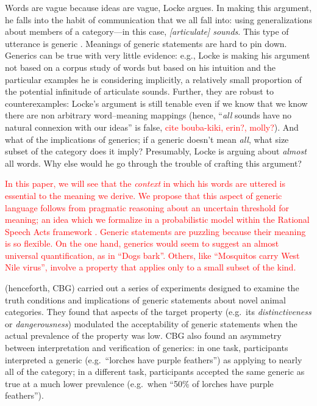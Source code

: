 \documentclass[10pt,letterpaper]{article}
\newcommand{\red}[1]{\textcolor{Red}{#1}}
\begin{document}
Words are vague because ideas are vague, Locke argues. In making this argument, he falls into the habit of communication that we all fall into: using generalizations about members of a category---in this case, \emph{[articulate] sounds}. This type of utterance is generic \cite{Carlson1977, Leslie2008}. Meanings of generic statements are hard to pin down. Generics can be true with very little evidence: e.g., Locke is making his argument not based on a corpus study of words but based on his intuition and the particular examples he is considering implicitly, a relatively small proportion of the potential infinitude of articulate sounds. Further, they are robust to counterexamples: Locke's argument is still tenable even if we know that we know there are non arbitrary word--meaning mappings (hence, ``\emph{all} sounds have no natural connexion with our ideas'' is false, \red{cite bouba-kiki, erin?, molly?}). And what of the implications of generics; if a generic doesn't mean \emph{all}, what size subset of the category does it imply? Presumably, Locke is arguing about \emph{almost} all words. Why else would he go through the trouble of crafting this argument?

\red{
In this paper, we will see that the \emph{context} in which his words are uttered is essential to the meaning we derive. We propose that this aspect of generic language follows from pragmatic reasoning about an uncertain threshold for meaning; an idea which we formalize in a probabilistic model within the Rational Speech Acts framework \cite{Frank2012,Goodman2013}.
%
Generic statements are puzzling because their meaning is so flexible. On the one hand, generics would seem to suggest an almost universal quantification, as in ``Dogs bark''. Others, like ``Mosquitos carry West Nile virus'', involve a property that applies only to a small subset of the kind. 
}

 (henceforth, CBG) carried out a series of experiments designed to examine the truth conditions and implications of generic statements about novel animal categories. 
They found that aspects of the target property (e.g.~its \emph{distinctiveness} or \emph{dangerousness}) modulated the acceptability of generic statements when the actual prevalence of the property was low. 
%
CBG also found an asymmetry between interpretation and verification of generics: in one task, participants interpreted a generic (e.g.~``lorches have purple feathers'') as applying to nearly all of the category; in a different task, participants accepted the same generic as true at a much lower prevalence (e.g.~when ``50\% of lorches have purple feathers'').
\end{document}
